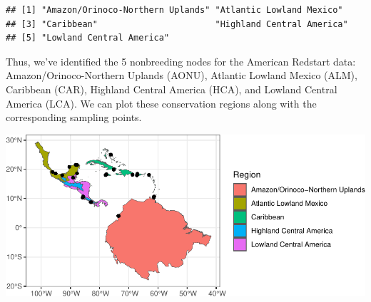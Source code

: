 \documentclass[
]{book}
\newenvironment{Shaded}{\begin{snugshade}}{\end{snugshade}}
\newcommand{\AttributeTok}[1]{\textcolor[rgb]{0.13,0.29,0.53}{#1}}
\newcommand{\CommentTok}[1]{\textcolor[rgb]{0.56,0.35,0.01}{\textit{#1}}}
\newcommand{\FunctionTok}[1]{\textcolor[rgb]{0.13,0.29,0.53}{\textbf{#1}}}
\newcommand{\NormalTok}[1]{#1}
\newcommand{\OtherTok}[1]{\textcolor[rgb]{0.56,0.35,0.01}{#1}}
\newcommand{\SpecialCharTok}[1]{\textcolor[rgb]{0.81,0.36,0.00}{\textbf{#1}}}
\begin{document}
\begin{verbatim}
## [1] "Amazon/Orinoco-Northern Uplands" "Atlantic Lowland Mexico"        
## [3] "Caribbean"                       "Highland Central America"       
## [5] "Lowland Central America"
\end{verbatim}

Thus, we've identified the 5 nonbreeding nodes for the American Redstart data: Amazon/Orinoco-Northern Uplands (AONU), Atlantic Lowland Mexico (ALM), Caribbean (CAR), Highland Central America (HCA), and Lowland Central America (LCA). We can plot these conservation regions along with the corresponding sampling points.

\begin{Shaded}
\end{Shaded}

\includegraphics{Mignette_files/figure-latex/unnamed-chunk-14-1.pdf}
\end{document}
